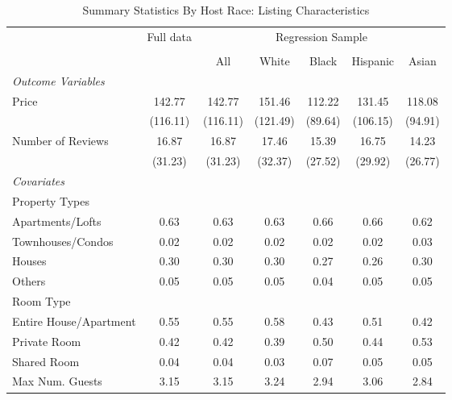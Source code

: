 \begin{table}[htbp]
\caption{Summary Statistics By Host Race: Listing Characteristics}
\begin{center}%
\small\begin{tabular}{l c | c | c c c c}
& \multicolumn{1}{c}{Full data} & \multicolumn{5}{c}{Regression Sample}
\\
 \cmidrule(r){3-7}
\\
 & \multicolumn{1}{c}{} & \multicolumn{1}{c}{All} & White & Black & Hispanic & Asian
\\
\hline\hline\noalign{\smallskip} 
 \textit{\textit{Outcome Variables}} & & & & & & \\ Price & 142.77 & 142.77 & 151.46 & 112.22 & 131.45 & 118.08 \\
 & (116.11) & (116.11) & (121.49) & (89.64) & (106.15) & (94.91) \\
 Number of Reviews & 16.87 & 16.87 & 17.46 & 15.39 & 16.75 & 14.23 \\
 & (31.23) & (31.23) & (32.37) & (27.52) & (29.92) & (26.77) \\
 \textit{Covariates} & & & & & & \\ \hline Property Types & & & & & & \\ \hspace{10bp}Apartments/Lofts    & 0.63 & 0.63 & 0.63 & 0.66 & 0.66 & 0.62 \\ \hspace{10bp}Townhouses/Condos   & 0.02 & 0.02 & 0.02 & 0.02 & 0.02 & 0.03 \\ \hspace{10bp}Houses                      & 0.30 & 0.30 & 0.30 & 0.27 & 0.26 & 0.30 \\ \hspace{10bp}Others                              & 0.05 & 0.05 & 0.05 & 0.04 & 0.05 & 0.05 \\Room Type &&&&&& \\ \hspace{10bp}Entire House/Apartment      & 0.55 & 0.55 & 0.58 & 0.43 & 0.51 & 0.42 \\ \hspace{10bp}Private Room                        & 0.42 & 0.42 & 0.39 & 0.50 & 0.44 & 0.53 \\ \hspace{10bp}Shared Room                         & 0.04 & 0.04 & 0.03 & 0.07 & 0.05 & 0.05 \\ Max Num. Guests & 3.15 & 3.15 & 3.24 & 2.94 & 3.06 & 2.84 \\

\end{tabular}
\end{center}
\end{table}
